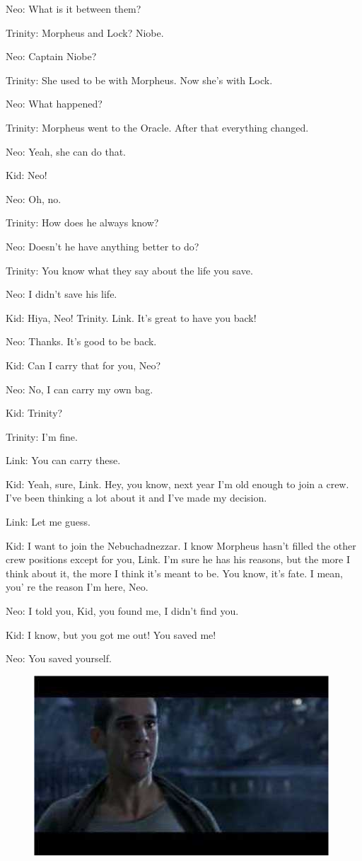 \documentclass{ctexart}
\newenvironment{myquote}{\color{green} \setlength{\leftskip}{6em} \setlength{\rightskip}{4em} \setlength{\parindent}{-2em}}{\par}
\begin{document}
\begin{myquote}
Neo: What is it between them?

Trinity: Morpheus and Lock? Niobe.

Neo: Captain Niobe?

Trinity: She used to be with Morpheus. Now she's with Lock.

Neo: What happened?

Trinity: Morpheus went to the Oracle. After that everything changed.

Neo: Yeah, she can do that.

Kid: Neo!

Neo: Oh, no.

Trinity: How does he always know?

Neo: Doesn't he have anything better to do?

Trinity: You know what they say about the life you save.

Neo: I didn't save his life.

Kid: Hiya, Neo! Trinity. Link. It's great to have you back!

Neo: Thanks. It's good to be back.

Kid: Can I carry that for you, Neo?

Neo: No, I can carry my own bag.

Kid: Trinity?

Trinity: I'm fine.

Link: You can carry these.

Kid: Yeah, sure, Link. Hey, you know, next year I'm old enough to join a crew. I've been thinking a lot about it and I've made my decision.

Link: Let me guess.

Kid: I want to join the Nebuchadnezzar. I know Morpheus hasn't filled the other crew positions except for you, Link. I'm sure he has his reasons, but the more I think about it, the more I think it's meant to be. You know, it's fate. I mean, you' re the reason I'm here, Neo.

Neo: I told you, Kid, you found me, I didn't find you.

Kid: I know, but you got me out! You saved me!

Neo: You saved yourself.
\end{myquote}

\begin{figure}[htb]
\centering
\includegraphics[width=0.5\linewidth]{fig/read_reloaded-35}
\end{figure}
\end{document}
